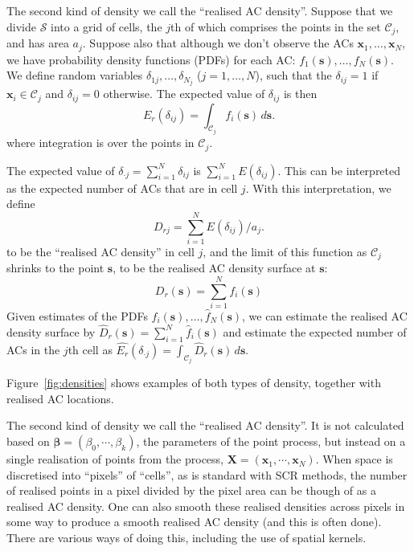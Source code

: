 \documentclass[useAMS,usenatbib,referee]{biom}
\begin{document}
The second kind of density we call the ``realised AC density''. Suppose that we divide $\mathcal{S}$ into a grid of cells, the $j$th of which comprises the points in the set $\mathcal{C}_j$, and has area $a_j$. Suppose also that although we don't observe the ACs $\bm{x}_1,\ldots,\bm{x}_N$, we  have probability density functions (PDFs) for each AC: $f_1(\bm{s}),\ldots,f_N(\bm{s})$. We define random variables $\delta_{1j},\ldots,\delta_{N_j}$ ($j=1,\ldots,N$), such that the $\delta_{ij}=1$ if $\bm{x}_i\in\mathcal{C}_j$ and $\delta_{ij}=0$ otherwise. The expected value of $\delta_{ij}$ is then 
\begin{equation}
E_r(\delta_{ij})=\int_{\mathcal{C}_j} f_i(\bm{s}) \, d\bm{s}. \label{eq:realised-p_ij}
\end{equation}
\noindent
where integration is over the points in $\mathcal{C}_j$.

The expected value of $\delta_{\cdot j}=\sum_{i=1}^N\delta_{ij}$ is $\sum_{i=1}^N E(\delta_{ij})$. This can be interpreted as the expected number of ACs that are in cell $j$. With this interpretation, we define 
\begin{equation}
  D_{rj} = \sum_{i = 1}^N E(\delta_{ij})/a_j. \label{eq:realised-D_rj}
\end{equation}
\noindent 
to be the ``realised AC density'' in cell $j$, and the limit of this function as $\mathcal{C}_j$ shrinks to the point $\bm{s}$, to be the realised AC density surface at $\bm{s}$:
\begin{equation}
D_r(\bm{s})=\sum_{i=1}^N f_i(\bm{s}) \label{eq:realised-D}
\end{equation}
\noindent
Given estimates of the PDFs $\hat{f}_i(\bm{s}),\ldots,\hat{f}_N(\bm{s})$, we can estimate the realised AC density surface by $\hat{D}_r(\bm{s})=\sum_{i = 1}^N\hat{f}_i(\bm{s})$ and estimate the expected number of ACs in the $j$th cell as $\hat{E_r}(\delta_{\cdot j})=\int_{\mathcal{C}_j}\hat{D}_r(\bm{s}) \, d\bm{s}$.

Figure~\ref{fig:densities} shows examples of both types of density, together with realised AC locations.


The second kind of density we call the ``realised AC density''. It is not calculated based on $\bm{\beta} = (\beta_0, \cdots, \beta_k)$, the parameters of the point process, but instead on a single realisation of points from the process, $\bm{X} = (\bm{x}_1, \cdots, \bm{x}_N)$. When space is discretised into ``pixels'' of ``cells'', as is standard with SCR methods, the number of realised points in a pixel divided by the pixel area can be though of as a realised AC density. One can also smooth these realised densities across pixels in some way to produce a smooth realised AC density (and this is often done). There are various ways of doing this, including the use of spatial kernels.
\end{document}
